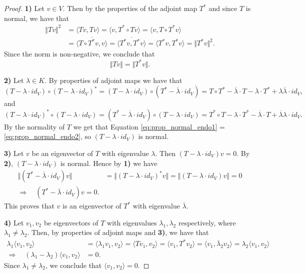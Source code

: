 \begin{proof}
	\textbf{1)} Let $v \in V$. Then by the properties of the adjoint map $T^*$ and since $T$ is normal, we have that
	\begin{align*}
		\Vert T v \Vert ^2 &= \langle Tv, Tv\rangle = \langle v, T^*\circ Tv\rangle = \langle v, T \circ T^* v\rangle \\
		&= \overline{\langle T \circ T^*v, v\rangle} = \overline{\langle T^*v, T^*v \rangle} = \langle T^*v, T^*v \rangle = \Vert T^* v\Vert ^2.
	\end{align*}
	Since the norm is non-negative, we conclude that
	\[
		\Vert Tv \Vert = \Vert T^*v\Vert.
	\]
	
	\textbf{2)} Let $\lambda \in K$. By properties of adjoint maps we have that
	\begin{equation}
		\label{eq:prop_normal_endo1}
		(T - \lambda \cdot id_V) \circ (T- \lambda \cdot id_V)^* = (T - \lambda \cdot id_V) \circ (T^* - \overline{\lambda} \cdot id_V) = T \circ T^* - \overline{\lambda}\cdot T - \lambda \cdot T^* + \lambda \overline{\lambda} \cdot id_V,
	\end{equation}
	and 
	\begin{equation}
		\label{eq:prop_normal_endo2}
		(T - \lambda\cdot id_V)^* \circ (T - \lambda \cdot id_V) = (T^* - \overline{\lambda}\cdot id_V)\circ (T - \lambda \cdot id_V) = T^* \circ T - \lambda \cdot T^* - \overline{\lambda}\cdot T + \overline{\lambda}\lambda \cdot id_V.
	\end{equation}
	By the normality of $T$ we get that Equation \eqref{eq:prop_normal_endo1} = \eqref{eq:prop_normal_endo2}, so $(T - \lambda \cdot id_V)$ is normal.
	
	\textbf{3)} Let $v$ be an eigenvector of $T$ with eigenvalue $\lambda$. Then $(T - \lambda \cdot id_V) v = 0$. By \textbf{2)}, $(T - \lambda \cdot id_V)$ is normal. Hence by \textbf{1)} we have
	\begin{align*}
		\Vert (T^* - \overline{\lambda} \cdot id_V)v \Vert &= \Vert (T - \lambda \cdot id_V)^* v \Vert = \Vert (T - \lambda \cdot id_V)v \Vert = 0\\
		\Longrightarrow \quad (T^* - \overline{\lambda} \cdot id_V)v = 0.
	\end{align*}
	This proves that $v$ is an eigenvector of $T^*$ with eigenvalue $\overline{\lambda}$.
	
	\textbf{4)} Let $v_1, v_2$ be eigenvectors of $T$ with eigenvalues $\lambda_1, \lambda_2$ respectively, where $\lambda_1 \neq \lambda_2$. Then, by properties of adjoint maps and \textbf{3)}, we have that
	\begin{align*}
		\lambda_1 \langle v_1, v_2 \rangle &= \langle \lambda_1 v_1, v_2 \rangle = \langle Tv_1, v_2 \rangle 
		= \langle v_1, T^*v_2 \rangle = \langle v_1, \overline{\lambda}_2 v_2 \rangle = \lambda_2 \langle v_1, v_2 \rangle\\
		\Longrightarrow \quad (\lambda_1 - \lambda_2) \langle v_1, v_2 \rangle &= 0.
	\end{align*}
	Since $\lambda_1 \neq \lambda_2$, we conclude that $\langle v_1, v_2 \rangle = 0$. \qedhere
\end{proof}


